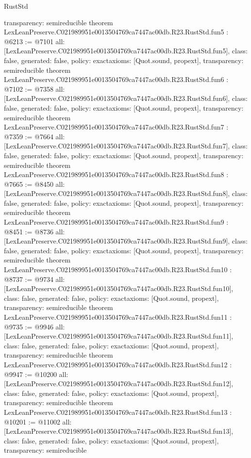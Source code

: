 \begin{lexlean}{RustStd}
\begin{coremodule}
{  transparency: semireducible
}
theorem LexLeanPreserve.C021989951e0013504769ca7447ac00db.R23.RustStd.fun5 : @6213 := @7101 {
  all: [LexLeanPreserve.C021989951e0013504769ca7447ac00db.R23.RustStd.fun5],
  class: false,
  generated: false,
  policy: exact{axioms: [Quot.sound, propext]},
  transparency: semireducible
}
theorem LexLeanPreserve.C021989951e0013504769ca7447ac00db.R23.RustStd.fun6 : @7102 := @7358 {
  all: [LexLeanPreserve.C021989951e0013504769ca7447ac00db.R23.RustStd.fun6],
  class: false,
  generated: false,
  policy: exact{axioms: [Quot.sound, propext]},
  transparency: semireducible
}
theorem LexLeanPreserve.C021989951e0013504769ca7447ac00db.R23.RustStd.fun7 : @7359 := @7664 {
  all: [LexLeanPreserve.C021989951e0013504769ca7447ac00db.R23.RustStd.fun7],
  class: false,
  generated: false,
  policy: exact{axioms: [Quot.sound, propext]},
  transparency: semireducible
}
theorem LexLeanPreserve.C021989951e0013504769ca7447ac00db.R23.RustStd.fun8 : @7665 := @8450 {
  all: [LexLeanPreserve.C021989951e0013504769ca7447ac00db.R23.RustStd.fun8],
  class: false,
  generated: false,
  policy: exact{axioms: [Quot.sound, propext]},
  transparency: semireducible
}
theorem LexLeanPreserve.C021989951e0013504769ca7447ac00db.R23.RustStd.fun9 : @8451 := @8736 {
  all: [LexLeanPreserve.C021989951e0013504769ca7447ac00db.R23.RustStd.fun9],
  class: false,
  generated: false,
  policy: exact{axioms: [Quot.sound, propext]},
  transparency: semireducible
}
theorem LexLeanPreserve.C021989951e0013504769ca7447ac00db.R23.RustStd.fun10 : @8737 := @9734 {
  all: [LexLeanPreserve.C021989951e0013504769ca7447ac00db.R23.RustStd.fun10],
  class: false,
  generated: false,
  policy: exact{axioms: [Quot.sound, propext]},
  transparency: semireducible
}
theorem LexLeanPreserve.C021989951e0013504769ca7447ac00db.R23.RustStd.fun11 : @9735 := @9946 {
  all: [LexLeanPreserve.C021989951e0013504769ca7447ac00db.R23.RustStd.fun11],
  class: false,
  generated: false,
  policy: exact{axioms: [Quot.sound, propext]},
  transparency: semireducible
}
theorem LexLeanPreserve.C021989951e0013504769ca7447ac00db.R23.RustStd.fun12 : @9947 := @10200 {
  all: [LexLeanPreserve.C021989951e0013504769ca7447ac00db.R23.RustStd.fun12],
  class: false,
  generated: false,
  policy: exact{axioms: [Quot.sound, propext]},
  transparency: semireducible
}
theorem LexLeanPreserve.C021989951e0013504769ca7447ac00db.R23.RustStd.fun13 : @10201 := @11002 {
  all: [LexLeanPreserve.C021989951e0013504769ca7447ac00db.R23.RustStd.fun13],
  class: false,
  generated: false,
  policy: exact{axioms: [Quot.sound, propext]},
  transparency: semireducible
}
\end{coremodule}
\end{lexlean}
